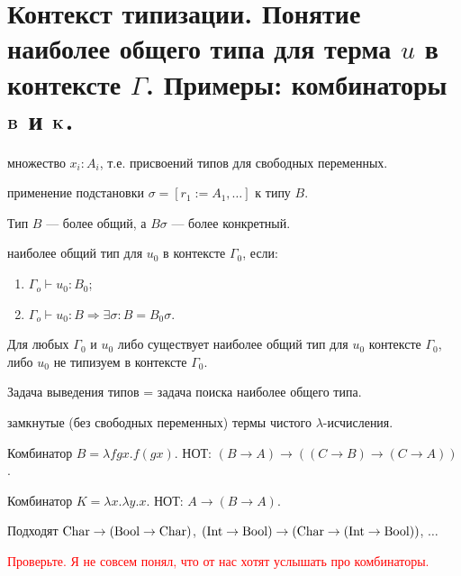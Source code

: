 \section{Контекст типизации. Понятие наиболее общего типа для терма \texorpdfstring{$u$}{} в контексте \texorpdfstring{$\Gamma$}{}. Примеры: комбинаторы \texorpdfstring{$\mathbf{B}$}{} и \texorpdfstring{$\mathbf{K}$}{}.}

\begin{definition}[Контекст]
множество $x_i:A_i$, т.е. присвоений типов для свободных переменных.
\end{definition}


\begin{definition}[B$\sigma$]
применение подстановки $\sigma = [r_1 := A_1, \ldots]$ к типу $B$.

Тип $B$ --- более общий, а $B\sigma$ --- более конкретный.
\end{definition}

\begin{definition}[$B_0$]
наиболее общий тип для $u_0$ в контексте $\Gamma_0$, если:
\begin{enumerate}
    \item $\Gamma_o \vdash u_0 : B_0$;
    \item $\Gamma_o \vdash u_0 : B \Rightarrow \exists \sigma : B = B_0 \sigma$.
\end{enumerate}
\end{definition}


\begin{theorem}
Для любых $\Gamma_0$ и $u_0$ либо существует наиболее общий тип для $u_0$ контексте $\Gamma_0$, либо $u_0$ не типизуем в контексте $\Gamma_0$.
\end{theorem}

\begin{corollary}
Задача выведения типов = задача поиска наиболее общего типа.
\end{corollary}


\begin{definition}[Комбинатор]
замкнутые (без свободных переменных) термы чистого $\lambda$-исчисления.
\end{definition}

Комбинатор $B = \lambda fgx. f(gx)$. 
НОТ: $(B \to A) \to ((C \to B) \to (C \to A))$.

Комбинатор $K = \lambda x . \lambda y . x$.
НОТ: $A \to (B \to A)$.

Подходят $\operatorname{Char} \to (\operatorname{Bool} \to \operatorname{Char})$, $(\operatorname{Int} \to \operatorname{Bool}) \to (\operatorname{Char} \to (\operatorname{Int} \to \operatorname{Bool}))$, $\ldots$

\textcolor{red}{Проверьте. Я не совсем понял, что от нас хотят услышать про комбинаторы.}


